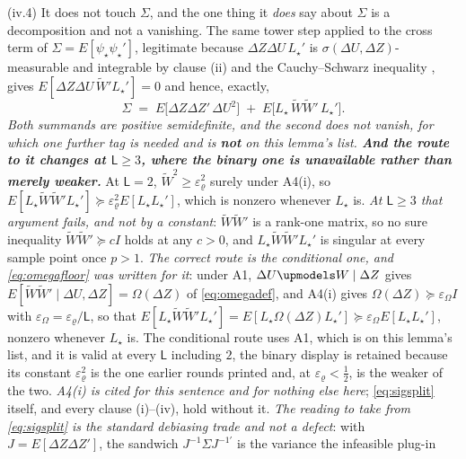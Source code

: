 \begin{lemma}[{The moment is valid, its variance is finite, its $\theta$-Jacobian is $-J$, and $J=E[\Delta Z\Delta Z']$}]
\textup{(iv.4)} It does not touch $\Sigma$, and the one thing it \emph{does} say about $\Sigma$ is a
decomposition and not a vanishing. The same tower step applied to the cross term of
$\Sigma=E[\psi_\star\psi_\star']$, legitimate because $\Delta Z\Delta U\,L_\star'$ is
$\sigma(\Delta U,\Delta Z)$-measurable and integrable by clause (ii) and the Cauchy--Schwarz inequality
, gives $E[\Delta Z\Delta U\,\widetilde W'L_\star']=0$ and hence, exactly,
\begin{equation}\label{eq:sigsplit}
\Sigma\;=\;E\big[\Delta Z\Delta Z'\,\Delta U^{2}\big]\;+\;E\big[L_\star\,\widetilde W\widetilde W'\,L_\star'\big] .
\end{equation}
\emph{Both summands are positive semidefinite, and the second does not vanish, for which one further
tag is needed and is \textbf{not} on this lemma's list. \textbf{And the route to it changes at
$\mathsf L\ge3$, where the binary one is unavailable rather than merely weaker.}} At $\mathsf L=2$,
$\widetilde W^{2}\ge\varepsilon_\varrho^{2}$ surely under A4(i), so
$E[L_\star\widetilde W\widetilde W'L_\star']\succeq\varepsilon_\varrho^{2}E[L_\star L_\star']$, which is
nonzero whenever $L_\star$ is. \emph{At $\mathsf L\ge3$ that argument fails, and not by a constant}:
$\widetilde W\widetilde W'$ is a rank-one matrix, so no sure inequality
$\widetilde W\widetilde W'\succeq cI$ holds at any $c>0$, and $L_\star\widetilde W\widetilde W'L_\star'$
is singular at every sample point once $p>1$. \emph{The correct route is the conditional one, and
\eqref{eq:omegafloor} was written for it}: under A1, $\Delta U\upmodels W\mid\Delta Z$ gives
$E[\widetilde W\widetilde W'\mid\Delta U,\Delta Z]=\Omega(\Delta Z)$ of \eqref{eq:omegadef}, and A4(i)
gives $\Omega(\Delta Z)\succeq\varepsilon_\Omega I$ with $\varepsilon_\Omega=\varepsilon_\varrho/\mathsf L$,
so that
$E[L_\star\widetilde W\widetilde W'L_\star']=E[L_\star\Omega(\Delta Z)L_\star']\succeq\varepsilon_\Omega
E[L_\star L_\star']$, nonzero whenever $L_\star$ is. The conditional route uses A1, which is on this
lemma's list, and it is valid at every $\mathsf L$ including $2$, the binary display is retained
because its constant $\varepsilon_\varrho^{2}$ is the one earlier rounds printed and, at
$\varepsilon_\varrho<\tfrac12$, is the weaker of the two. \emph{A4(i) is cited
for this sentence and for nothing else here}; \eqref{eq:sigsplit} itself, and every clause
\textup{(i)}--\textup{(iv)}, hold without it. \emph{The reading to
take from \eqref{eq:sigsplit} is the standard debiasing trade and not a defect}: with
$J=E[\Delta Z\Delta Z']$, the sandwich $J^{-1}\Sigma J^{-1\prime}$ is the variance the infeasible plug-in

\end{lemma}

